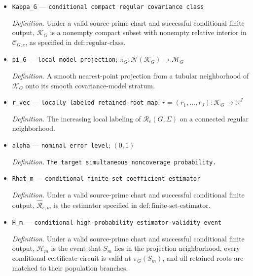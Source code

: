 \documentclass{article}
\begin{document}
\begin{itemize}
  \par\smallskip\noindent\emph{Definition.} For finite \(A,B\subset\mathbb R\), \(d_H(A,B)\) is the ordinary Hausdorff distance when both sets are nonempty, \(d_H(\varnothing,\varnothing)=0\), and \(d_H(A,B)=\infty\) when exactly one of \(A,B\) is empty.
  \item \texttt{Kappa\_\allowbreak{}G} --- \texttt{conditional compact regular covariance class}
  \par\smallskip\noindent\emph{Definition.} Under a valid source-prime chart and successful conditional finite output, \(\mathcal K_G\) is a nonempty compact subset with nonempty relative interior in \(\mathcal C_{G,e}\), as specified in \(\mathrm{def:regular\mbox{-}class}\).
  \item \texttt{pi\_\allowbreak{}G} --- \texttt{local model projection}; \(\pi_G:\mathcal N(\mathcal K_G)\to\mathcal M_G\)
  \par\smallskip\noindent\emph{Definition.} A smooth nearest-point projection from a tubular neighborhood of \(\mathcal K_G\) onto its smooth covariance-model stratum.
  \item \texttt{r\_\allowbreak{}vec} --- \texttt{locally labeled retained-\allowbreak{}root map}; \(r=(r_1,\ldots,r_J):\mathcal K_G\to\mathbb R^J\)
  \par\smallskip\noindent\emph{Definition.} The increasing local labeling of \(\mathcal R_e(G,\Sigma)\) on a connected regular neighborhood.
  \item \texttt{alpha} --- \texttt{nominal error level}; \((0,1)\)
  \par\smallskip\noindent\emph{Definition.} \texttt{The target simultaneous noncoverage probability.}
  \item \texttt{Rhat\_\allowbreak{}m} --- \texttt{conditional finite-\allowbreak{}set coefficient estimator}
  \par\smallskip\noindent\emph{Definition.} Under a valid source-prime chart and successful conditional finite output, \(\widehat{\mathcal R}_{e,m}\) is the estimator specified in \(\mathrm{def:finite\mbox{-}set\mbox{-}estimator}\).
  \item \texttt{H\_\allowbreak{}m} --- \texttt{conditional high-\allowbreak{}probability estimator-\allowbreak{}validity event}
  \par\smallskip\noindent\emph{Definition.} Under a valid source-prime chart and successful conditional finite output, \(\mathcal H_m\) is the event that \(S_m\) lies in the projection neighborhood, every conditional certificate circuit is valid at \(\pi_G(S_m)\), and all retained roots are matched to their population branches.

\end{itemize}
\end{document}
